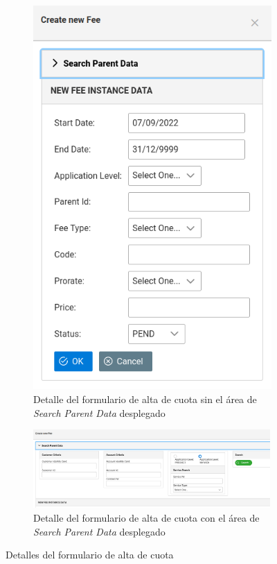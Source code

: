 \begin{figure}[H]
  \centering
  \begin{subfigure}[c]{0.4\textwidth}
    \includegraphics[width=\textwidth]{imaxes/formulario-alta-cuota-01.png}
    \caption{Detalle del formulario de alta de cuota sin el área de \emph{Search Parent Data} desplegado}
    \label{fig:formulario-alta-cuota-01}
  \end{subfigure}
  \hspace{0.1\textwidth}
  \begin{subfigure}[c]{0.4\textwidth}
    \includegraphics[width=\textwidth,height=3cm]{imaxes/formulario-alta-cuota-02.png}
    \caption{Detalle del formulario de alta de cuota con el área de \emph{Search Parent Data} desplegado}
    \label{fig:formulario-alta-cuota-02}
  \end{subfigure}
  \caption{Detalles del formulario de alta de cuota}
  \label{fig:parametrizacion}
\end{figure}


